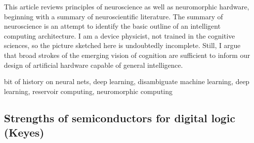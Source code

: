 \documentclass[twocolumn]{article}
\begin{document}
This article reviews principles of neuroscience as well as neuromorphic hardware, beginning with a summary of neuroscientific literature. The summary of neuroscience is an attempt to identify the basic outline of an intelligent computing architecture. I am a device physicist, not trained in the cognitive sciences, so the picture sketched here is undoubtedly incomplete. Still, I argue that broad strokes of the emerging vision of cognition are sufficient to inform our design of artificial hardware capable of general intelligence. 

\vspace{3em}
bit of history on neural nets, deep learning, disambiguate machine learning, deep learning, reservoir computing, neuromorphic computing

\subsection{\label{sec:keyes}Strengths of semiconductors for digital logic (Keyes)}
\cite{ke1985a,ke1985b}
\end{document}

